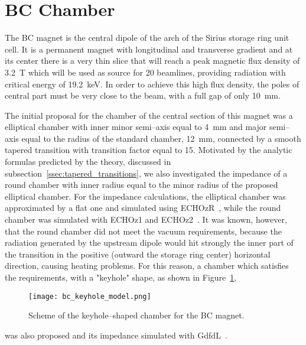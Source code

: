 \section{BC Chamber}\label{sec:bc_chamber}

    The BC magnet is the central dipole of the arch of the Sirius storage ring unit cell. It is a permanent magnet with longitudinal and transverse gradient and at its center there is a very thin slice that will reach a peak magnetic flux density of \SI{3.2}{\tesla} which will be used as source for 20 beamlines, providing radiation with critical energy of \SI{19.2}{\kilo\electronvolt}. In order to achieve this high flux density, the poles of central part must be very close to the beam, with a full gap of only \SI{10}{\milli\meter}.

    The initial proposal for the chamber of the central section of this magnet was a elliptical chamber with inner minor semi--axis equal to \SI{4}{\milli\meter} and major semi--axis equal to the radius of the standard chamber, \SI{12}{\milli\meter}, connected by a smooth tapered transition with transition factor equal to 15. Motivated by the analytic formulas predicted by the theory, discussed in subsection~\ref{ssec:tapered_transitions}, we also investigated the impedance of a round chamber with inner radius equal to the minor radius of the proposed elliptical chamber. For the impedance calculations, the elliptical chamber was approximated by a flat one and simulated using ECHOzR~\cite{Zagorodnov2015}, while the round chamber was simulated with ECHOz1 and ECHOz2~\cite{Zagorodnov2005}. It was known, however, that the round chamber did not meet the vacuum requirements, because the radiation generated by the upstream dipole would hit strongly the inner part of the transition in the positive (outward the storage ring center) horizontal direction, causing heating problems. For this reason, a chamber which satisfies the requirements, with a "keyhole" shape, as shown in Figure~\ref{fig:bc_keyhole_model},
    \begin{figure}
        \centering
        \texttt{[image: bc\_keyhole\_model.png]}
        \caption{Scheme of the keyhole--shaped chamber for the BC magnet.}
        \label{fig:bc_keyhole_model}
    \end{figure}
    was also proposed and its impedance simulated with GdfdL~\cite{Bruns2017}.

